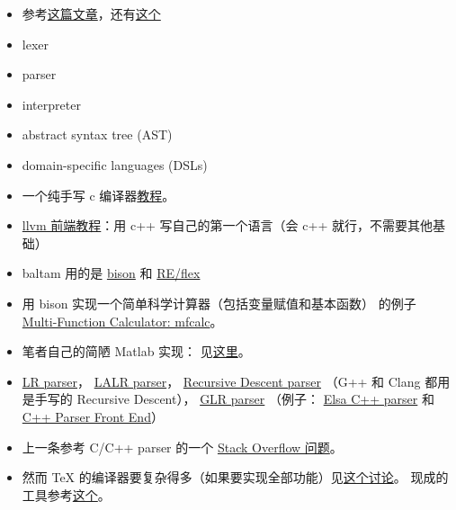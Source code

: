 
\begin{issues}
\issueDraft
\end{issues}

\begin{itemize}
\item 参考\href{https://www.toptal.com/scala/writing-an-interpreter}{这篇文章}，还有\href{https://www.youtube.com/watch?v=Xu4RtLlm42I}{这个}
\item lexer
\item parser
\item interpreter
\item abstract syntax tree (AST)
\item domain-specific languages (DSLs)
\item 一个纯手写 c 编译器\href{https://norasandler.com/2017/11/29/Write-a-Compiler.html}{教程}。
\item \href{https://llvm.org/docs/tutorial/MyFirstLanguageFrontend/index.html}{llvm 前端教程}：用 c++ 写自己的第一个语言（会 c++ 就行，不需要其他基础）
\item baltam 用的是 \href{https://www.gnu.org/software/bison/}{bison} 和 \href{https://www.genivia.com/doc/reflex/html/}{RE/flex}
\item 用 bison 实现一个简单科学计算器（包括变量赋值和基本函数） 的例子 \href{http://web.mit.edu/gnu/doc/html/bison_5.html}{Multi-Function Calculator: mfcalc}。
\item 笔者自己的简陋 Matlab 实现： 见\href{https://github.com/MacroUniverse/bison_test}{这里}。
\item \href{https://en.wikipedia.org/wiki/LR_parser}{LR parser}， \href{https://en.wikipedia.org/wiki/LALR_parser}{LALR parser}， \href{https://en.wikipedia.org/wiki/Recursive_descent_parser}{Recursive Descent parser} （G++ 和 Clang 都用是手写的 Recursive Descent）， \href{https://en.wikipedia.org/wiki/GLR_parser}{GLR parser} （例子： \href{http://www.scottmcpeak.com/elkhound/}{Elsa C++ parser} 和 \href{http://www.semanticdesigns.com/Products/FrontEnds/CppFrontEnd.html}{C++ Parser Front End}）
\item 上一条参考 C/C++ parser 的一个 \href{https://stackoverflow.com/questions/6319086/are-gcc-and-clang-parsers-really-handwritten}{Stack Overflow 问题}。
\item 然而 TeX 的编译器要复杂得多（如果要实现全部功能）见\href{https://groups.google.com/g/comp.text.tex/c/E1736iEOxNI}{这个讨论}。 现成的工具参考\href{https://tex.stackexchange.com/questions/39309/convert-latex-to-html}{这个}。
\end{itemize}


